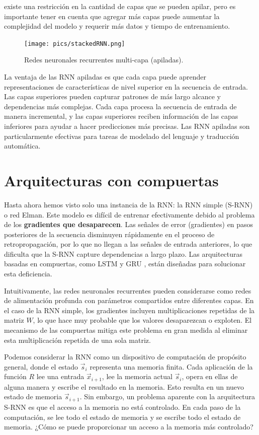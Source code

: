 existe una restricción en la cantidad de capas que se pueden apilar, pero es importante tener en cuenta que agregar más capas puede aumentar la complejidad del modelo y requerir más datos y tiempo de entrenamiento.

\begin{figure}[h]
  \centering
  \texttt{[image: pics/stackedRNN.png]}
  \caption{Redes neuronales recurrentes multi-capa (apiladas).}
\end{figure}

La ventaja de las RNN apiladas es que cada capa puede aprender representaciones de características de nivel superior en la secuencia de entrada. Las capas superiores pueden capturar patrones de más largo alcance y dependencias más complejas. Cada capa procesa la secuencia de entrada de manera incremental, y las capas superiores reciben información de las capas inferiores para ayudar a hacer predicciones más precisas. Las RNN apiladas son particularmente efectivas para tareas de modelado del lenguaje y traducción automática.


\section{Arquitecturas con compuertas}
Hasta ahora hemos visto solo una instancia de la RNN: la RNN simple (S-RNN) o red Elman. Este modelo es difícil de entrenar efectivamente debido al problema de los \textbf{gradientes que desaparecen}. Las señales de error (gradientes) en pasos posteriores de la secuencia disminuyen rápidamente en el proceso de retropropagación, por lo que no llegan a las señales de entrada anteriores, lo que dificulta que la S-RNN capture dependencias a largo plazo. Las arquitecturas basadas en compuertas, como LSTM \cite{hochreiter1997long} y GRU \cite{cho2014learning}, están diseñadas para solucionar esta deficiencia.

Intuitivamente, las redes neuronales recurrentes pueden considerarse como redes de alimentación profunda con parámetros compartidos entre diferentes capas. En el caso de la RNN simple, los gradientes incluyen multiplicaciones repetidas de la matriz $W$, lo que hace muy probable que los valores desaparezcan o exploten. El mecanismo de las compuertas mitiga este problema en gran medida al eliminar esta multiplicación repetida de una sola matriz.

Podemos considerar la RNN como un dispositivo de computación de propósito general, donde el estado $\vec{s}_i$ representa una memoria finita. Cada aplicación de la función $R$ lee una entrada $\vec{x}_{i+1}$, lee la memoria actual $\vec{s}_i$, opera en ellas de alguna manera y escribe el resultado en la memoria. Esto resulta en un nuevo estado de memoria $\vec{s}_{i+1}$. Sin embargo, un problema aparente con la arquitectura S-RNN es que el acceso a la memoria no está controlado. En cada paso de la computación, se lee todo el estado de memoria y se escribe todo el estado de memoria. ¿Cómo se puede proporcionar un acceso a la memoria más controlado?

